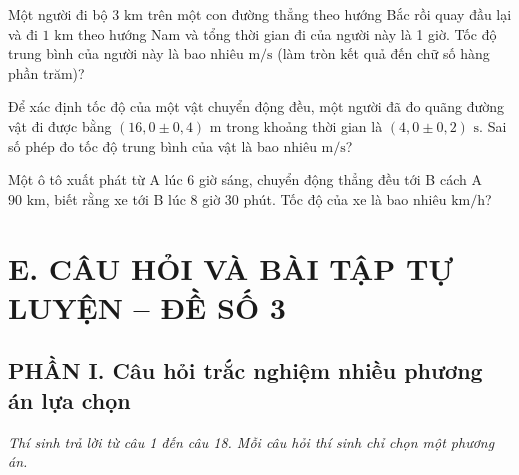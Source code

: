 \begin{ex} Một người đi bộ $3\text{ km}$ trên một con đường thẳng theo hướng Bắc rồi quay đầu lại và đi $1\text{ km}$ theo hướng Nam và tổng thời gian đi của người này là 1 giờ. Tốc độ trung bình của người này là bao nhiêu $\text{m/s}$ (làm tròn kết quả đến chữ số hàng phần trăm)?

\par{}
\end{ex}

\begin{ex} Để xác định tốc độ của một vật chuyển động đều, một người đã đo quãng đường vật đi được bằng $(16{,}0 \pm 0{,}4)\text{ m}$ trong khoảng thời gian là $(4{,}0 \pm 0{,}2)\text{ s}$. Sai số phép đo tốc độ trung bình của vật là bao nhiêu $\text{m/s}$?

\par{}
\end{ex}

\begin{ex} Một ô tô xuất phát từ A lúc 6 giờ sáng, chuyển động thẳng đều tới B cách A $90\text{ km}$, biết rằng xe tới B lúc 8 giờ 30 phút. Tốc độ của xe là bao nhiêu $\text{km/h}$?

\par{}
\end{ex}


\section*{E. CÂU HỎI VÀ BÀI TẬP TỰ LUYỆN -- ĐỀ SỐ 3}

\setcounter{ex}{0}
\subsection*{PHẦN I. Câu hỏi trắc nghiệm nhiều phương án lựa chọn}
\textit{Thí sinh trả lời từ câu 1 đến câu 18. Mỗi câu hỏi thí sinh chỉ chọn một phương án.}

